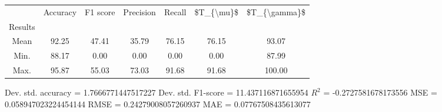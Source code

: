 \begin{tabular}{|c|c|c|c|c|c|c|}
\toprule
{} &  Accuracy &  F1 score &  Precision &  Recall &  \$T\_\{\textbackslash mu\}\$ &  \$T\_\{\textbackslash gamma\}\$ \\
Results &           &           &            &         &            &               \\
\hline
Mean    &     92.25 &     47.41 &      35.79 &   76.15 &      76.15 &         93.07 \\
Min.    &     88.17 &      0.00 &       0.00 &    0.00 &       0.00 &         87.99 \\
Max.    &     95.87 &     55.03 &      73.03 &   91.68 &      91.68 &        100.00 \\
\bottomrule
\end{tabular}

 Dev. std. accuracy = 1.7666771447517227
 Dev. std. F1-score = 11.437116871655954
 $R^2$ = -0.2727581678173556
 MSE = 0.058947023224454144
 RMSE = 0.24279008057260937
 MAE = 0.07767508435613077
